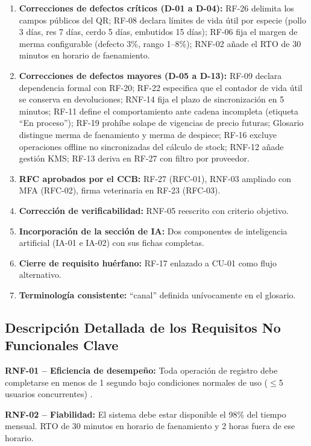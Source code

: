 \documentclass[11pt,a4paper]{article}
\begin{document}
\begin{enumerate}
  \item \textbf{Correcciones de defectos críticos (D-01 a D-04):} RF-26 delimita los campos públicos del QR; RF-08 declara límites de vida útil por especie (pollo 3 días, res 7 días, cerdo 5 días, embutidos 15 días); RF-06 fija el margen de merma configurable (defecto 3\%, rango 1--8\%); RNF-02 añade el RTO de 30 minutos en horario de faenamiento.
  \item \textbf{Correcciones de defectos mayores (D-05 a D-13):} RF-09 declara dependencia formal con RF-20; RF-22 especifica que el contador de vida útil se conserva en devoluciones; RNF-14 fija el plazo de sincronización en 5 minutos; RF-11 define el comportamiento ante cadena incompleta (etiqueta ``En proceso''); RF-19 prohíbe solape de vigencias de precio futuras; Glosario distingue merma de faenamiento y merma de despiece; RF-16 excluye operaciones offline no sincronizadas del cálculo de stock; RNF-12 añade gestión KMS; RF-13 deriva en RF-27 con filtro por proveedor.
  \item \textbf{RFC aprobados por el CCB:} RF-27 (RFC-01), RNF-03 ampliado con MFA (RFC-02), firma veterinaria en RF-23 (RFC-03).
  \item \textbf{Corrección de verificabilidad:} RNF-05 reescrito con criterio objetivo.
  \item \textbf{Incorporación de la sección de IA:} Dos componentes de inteligencia artificial (IA-01 e IA-02) con sus fichas completas.
  \item \textbf{Cierre de requisito huérfano:} RF-17 enlazado a CU-01 como flujo alternativo.
  \item \textbf{Terminología consistente:} ``canal'' definida unívocamente en el glosario.
\end{enumerate}

\subsection{Descripción Detallada de los Requisitos No Funcionales Clave}

\textbf{RNF-01 -- Eficiencia de desempeño:} Toda operación de registro debe completarse en menos de 1 segundo bajo condiciones normales de uso ($\leq$5 usuarios concurrentes) \cite{pohl2025}.

\textbf{RNF-02 -- Fiabilidad:} El sistema debe estar disponible el 98\% del tiempo mensual. RTO de 30 minutos en horario de faenamiento y 2 horas fuera de ese horario.
\end{document}
